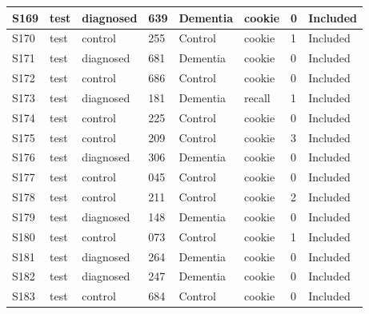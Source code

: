 \begin{center}
\begin{longtable}{|l|l|l|l|l|l|l|l|}
S169           & test                  & diagnosed         & 639     & Dementia       & cookie          & 0            & Included      \\ \hline
S170           & test                  & control           & 255     & Control        & cookie          & 1            & Included      \\ \hline
S171           & test                  & diagnosed         & 681     & Dementia       & cookie          & 0            & Included      \\ \hline
S172           & test                  & control           & 686     & Control        & cookie          & 0            & Included      \\ \hline
S173           & test                  & diagnosed         & 181     & Dementia       & recall          & 1            & Included      \\ \hline
S174           & test                  & control           & 225     & Control        & cookie          & 0            & Included      \\ \hline
S175           & test                  & control           & 209     & Control        & cookie          & 3            & Included      \\ \hline
S176           & test                  & diagnosed         & 306     & Dementia       & cookie          & 0            & Included      \\ \hline
S177           & test                  & control           & 045     & Control        & cookie          & 0            & Included      \\ \hline
S178           & test                  & control           & 211     & Control        & cookie          & 2            & Included      \\ \hline
S179           & test                  & diagnosed         & 148     & Dementia       & cookie          & 0            & Included      \\ \hline
S180           & test                  & control           & 073     & Control        & cookie          & 1            & Included      \\ \hline
S181           & test                  & diagnosed         & 264     & Dementia       & cookie          & 0            & Included      \\ \hline
S182           & test                  & diagnosed         & 247     & Dementia       & cookie          & 0            & Included      \\ \hline
S183           & test                  & control           & 684     & Control        & cookie          & 0            & Included      \\ \hline

\end{longtable}
\end{center}
